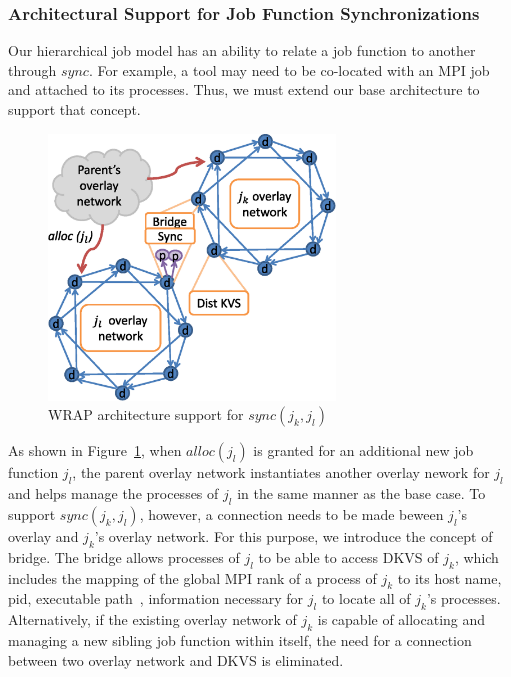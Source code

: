 \subsubsection{Architectural Support for Job Function Synchronizations}
\label{sect:sync}
Our hierarchical job model has an ability to relate a job function
to another through $sync$.
For example, a tool may need to be co-located with an MPI job
and attached to its processes.
Thus, we must extend our base architecture to support that concept.
\begin{figure}
  \centering
    \includegraphics[width=3.0in]{../fig/WRAP_newJobFunction.ps}
  \caption{WRAP architecture support for ${sync(j_k, j_l)}$}
  \label{syncext}
\end{figure}
As shown in Figure~\ref{syncext}, when $alloc(j_l)$
is granted for an additional new job function $j_l$,
the parent overlay network instantiates
another overlay nework for $j_l$ and helps manage
the processes of $j_l$ in the same manner as the base case.
To support ${sync(j_k, j_l)}$,
however, a connection needs to be made beween $j_l$'s
overlay and $j_k$'s overlay network.
For this purpose, we introduce the concept
of bridge. The bridge allows processes
of $j_l$ to be able to access DKVS of $j_k$, which includes
the mapping of the global MPI rank of a process of $j_k$
to its host name, pid, executable path~\cite{MPIRInterface},
information necessary for $j_l$ to locate all of $j_k$'s processes.
Alternatively, if the existing overlay network of $j_k$ is
capable of allocating and managing a new sibling job function
within itself, the need for a connection between two overlay
network and DKVS is eliminated.

